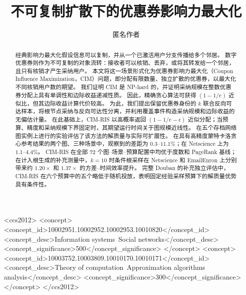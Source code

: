 \documentclass[sigconf,balance=false]{acmart}
\newcommand{\CIMRIS}{\textsc{CIM-RIS}}
\begin{document}
\title{不可复制扩散下的优惠券影响力最大化}

\author{匿名作者}

\renewcommand{\shortauthors}{匿名作者}

\begin{abstract}
经典影响力最大化假设信息可以复制，并从一个已激活用户分支传播给多个邻居。
数字优惠券则作为不可复制的对象流转：接收者可以核销、丢弃，或将其转发给一个邻居，且只有核销才产生采纳用户。
本文将这一场景形式化为优惠券影响力最大化（Coupon Influence Maximization，CIM）问题，即分配有限数量、独立扩散的优惠券，以最大化不同核销用户数的期望。
我们证明 CIM 是 NP-hard 的，并证明采纳规模在整数优惠券分配上具有单调性和边际收益递减性质。
因此，精确贪心算法可获得 $(1-1/e)$ 近似比，但其边际收益计算代价较高。
为此，我们提出保留优惠券身份的 $k$ 联合反向可达样本，将根节点采纳与反向可达性分离，并利用覆盖事件构造采纳规模和边际收益的无偏估计量。
在此基础上，\CIMRIS{} 以高概率返回 $(1-1/e-\epsilon)$ 近似分配；当预算、精度和采纳规模下界固定时，其期望运行时间关于图规模近线性。
在五个存档网络图实例上进行的实验评估了该方法的解质量与实际可扩展性。
在具有高精度蒙特卡洛贪心参考结果的两个图、三种场景中，观察到的差距为 $0.3$--$11.1\%$；在 Netscience 上为 $1.1$--$4.4\%$。
\CIMRIS{} 在全部 72 个图--场景--预算配置中均优于度数和 PageRank 基线；在计入根生成的补充测量中，$k=10$ 时条件根采样在 Netscience 和 EmailEnron 上分别带来约 $1.20\times$ 和 $1.37\times$ 的方差--时间效率提升。
完整 Douban 的补充独立评估中，\CIMRIS{} 在六个预算中的五个略低于随机投放，表明固定经验采样预算下的解质量优势具有条件性。
\end{abstract}

\begin{CCSXML}
<ccs2012>
 <concept>
  <concept_id>10002951.10002952.10002953.10010820</concept_id>
  <concept_desc>Information systems~Social networks</concept_desc>
  <concept_significance>500</concept_significance>
 </concept>
 <concept>
  <concept_id>10003752.10003809.10010170.10010171</concept_id>
  <concept_desc>Theory of computation~Approximation algorithms analysis</concept_desc>
  <concept_significance>300</concept_significance>
 </concept>
</ccs2012>
\end{CCSXML}



\maketitle
\end{document}
